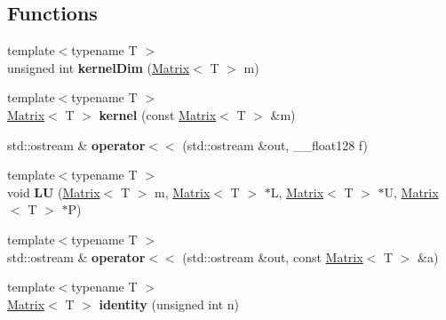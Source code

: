\subsection*{Functions}
\begin{DoxyCompactItemize}
\item 
\mbox{\label{namespacecore_a454289219bf2250360f530e482af7755}} 
{\footnotesize template$<$typename T $>$ }\\unsigned int {\bfseries kernel\+Dim} (\mbox{\hyperlink{classcore_1_1_matrix}{Matrix}}$<$ T $>$ m)
\item 
\mbox{\label{namespacecore_ad18b5e9458c79ee9eb1c2e9e1529f896}} 
{\footnotesize template$<$typename T $>$ }\\\mbox{\hyperlink{classcore_1_1_matrix}{Matrix}}$<$ T $>$ {\bfseries kernel} (const \mbox{\hyperlink{classcore_1_1_matrix}{Matrix}}$<$ T $>$ \&m)
\item 
\mbox{\label{namespacecore_a2484796fd2d0c666f35c8405bb87976f}} 
std\+::ostream \& {\bfseries operator$<$$<$} (std\+::ostream \&out, \+\_\+\+\_\+float128 f)
\item 
\mbox{\label{namespacecore_abdafacfcc7ff1bdb19a7dadd98a3e6c0}} 
{\footnotesize template$<$typename T $>$ }\\void {\bfseries LU} (\mbox{\hyperlink{classcore_1_1_matrix}{Matrix}}$<$ T $>$ m, \mbox{\hyperlink{classcore_1_1_matrix}{Matrix}}$<$ T $>$ $\ast$L, \mbox{\hyperlink{classcore_1_1_matrix}{Matrix}}$<$ T $>$ $\ast$U, \mbox{\hyperlink{classcore_1_1_matrix}{Matrix}}$<$ T $>$ $\ast$P)
\item 
\mbox{\label{namespacecore_ac5b64383255a4a138afb4523860123a8}} 
{\footnotesize template$<$typename T $>$ }\\std\+::ostream \& {\bfseries operator$<$$<$} (std\+::ostream \&out, const \mbox{\hyperlink{classcore_1_1_matrix}{Matrix}}$<$ T $>$ \&a)
\item 
\mbox{\label{namespacecore_a26f06bd6778d82d5b49bf8267f735d4d}} 
{\footnotesize template$<$typename T $>$ }\\\mbox{\hyperlink{classcore_1_1_matrix}{Matrix}}$<$ T $>$ {\bfseries identity} (unsigned int n)
\item 
\mbox{\label{namespacecore_a4d6fc95455392799334ded21f71dab52}} 

\end{DoxyCompactItemize}
